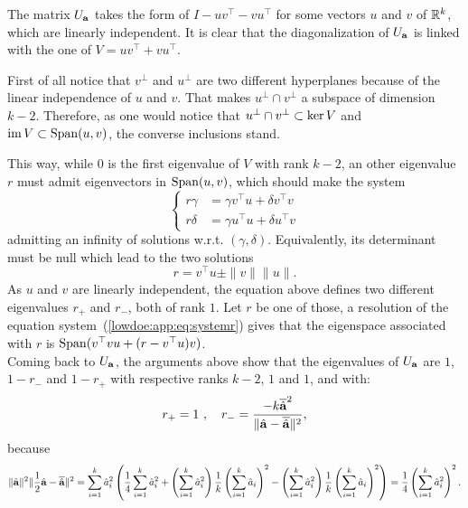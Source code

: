 The matrix $U_{\mathbf{a}}$ takes the form of $I-uv^{\top}-vu^{\top}$ for some vectors $u$ and $v$ of $\mathbb{R}^k$, which are linearly independent. It is clear that the diagonalization of $U_{\mathbf{a}}$ is linked with the one of $V=uv^{\top}+vu^{\top}$.

First of all notice that $v^\perp$ and $u^\perp$ are two different hyperplanes because of the linear independence of $u$ and $v$. That makes $u^\perp\cap v^\perp$ a subspace of dimension $k-2$. %
Therefore, as one would notice that $u^\perp\cap v^\perp\subset\operatorname{ker} V$ and $\operatorname{im} V\subset\operatorname{Span}(u,v)$, the converse inclusions stand.

This way, while $0$ is the first eigenvalue of $V$ with rank $k-2$, an other eigenvalue $r$ must admit eigenvectors in $\operatorname{Span}(u,v)$, which should make the system
    \begin{equation}\label{lowdoe:app:eq:systemr}
        \left\{\begin{array}{rl}
             r\gamma &= \gamma v^{\top}u+\delta v^{\top}v  \\
             r\delta &= \gamma u^{\top}u + \delta u^{\top}v 
        \end{array}  \right.
    \end{equation}
admitting an infinity of solutions w.r.t.{ }$(\gamma,\delta)$. Equivalently, its determinant must be null which lead to the two solutions 
    \begin{equation}
        r = v^{\top}u \pm \|v\|\|u\|.
    \end{equation}
As $u$ and $v$ are linearly independent, the equation above defines two different eigenvalues $r_+$ and $r_-$, both of rank $1$.
Let $r$ be one of those, a resolution of the equation system~(\ref{lowdoe:app:eq:systemr}) gives that the eigenspace associated with $r$ is $\operatorname{Span}(v^{\top}vu+(r-v^{\top}u)v)$.\\

Coming back to $U_{\mathbf{a}}$, the arguments above show that the eigenvalues of $U_{\mathbf{a}}$ are $1$, $1-r_-$ and $1-r_+$ with respective ranks $k-2$, $1$ and $1$, and with:
\begin{equation}
    r_+ = 1 \ ,\quad r_- = \frac{- k\overline{\hat{\mathbf{a}}}^2}{\|\hat{\mathbf{a}}-\overline{\hat{\mathbf{a}}} \|^2},
\end{equation}
because 
\begin{equation}
    \|\hatmbf a\|^2\|\frac{1}{2}\hatmbf a - \overline{\hatmbf a} \|^2  = \sum_{i=1}^k\hat a_i^2
    \left(\frac{1}{4}\sum_{i=1}^k\hat a_i^2 + \left(\sum_{i=1}^k\hat a_i^2\right)\frac{1}{k}\left(\sum_{i=1}^k\hat a_i\right)^2 - \left(\sum_{i=1}^k\hat a_i^2\right)\frac{1}{k}\left(\sum_{i=1}^k\hat a_i \right)^2 \right)
        = \frac{1}{4}\left(\sum_{i=1}^k\hat a_i^2\right)^2. %
\end{equation}

